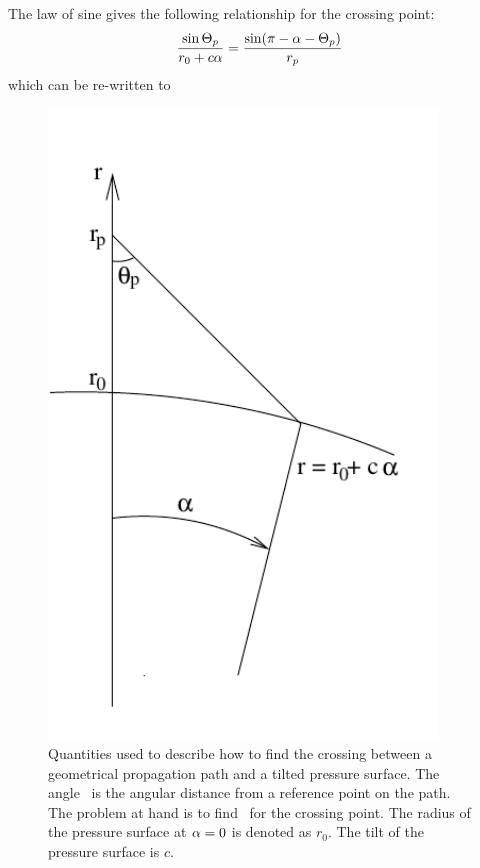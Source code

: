 The law of sine gives the following relationship for the crossing
point:
\begin{equation}
  \frac{\sin\Theta_p}{r_{0}+c\alpha} = 
                                \frac{\sin(\pi-\alpha-\Theta_p)}{r_{p}}
\end{equation}
which can be re-written to

\begin{figure}
 \begin{minipage}[c]{0.45\textwidth}
 \includegraphics*[width=0.92\textwidth]{psurf_crossing}
 \end{minipage}%
 \begin{minipage}[c]{0.55\textwidth}
  \caption{Quantities used to describe how to find the crossing between a 
    geometrical propagation path and a tilted pressure surface. The
    angle \Lat\ is the angular distance from a reference point on the
    path. The problem at hand is to find \Lat\ for the crossing
    point. The radius of the pressure surface at $\alpha = 0$ is
    denoted as $r_0$. The tilt of the pressure surface is $c$.}
  \label{fig:ppath:psurf_crossing}
 \end{minipage}%
\end{figure}   

